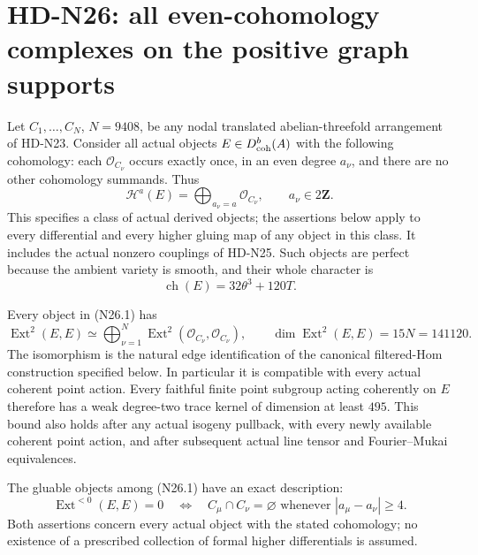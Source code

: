 \section{HD-N26: all even-cohomology complexes on the positive graph supports}
\label{sec:even-cohomology-graph-complexes}

Let $C_1,\ldots,C_N$, $N=9408$, be any nodal translated
abelian-threefold arrangement of HD-N23. Consider all actual
objects $E\in D^b_{\rm coh}(A)$ with the following cohomology:
each $\mathcal O_{C_\nu}$ occurs exactly once, in an even
degree $a_\nu$, and there are no other cohomology summands.
Thus
\[
 \mathcal H^a(E)=\bigoplus_{a_\nu=a}\mathcal O_{C_\nu},
 \qquad a_\nu\in2\mathbf Z.                              \tag{N26.1}
\]
This specifies a class of actual derived objects; the
assertions below apply to every differential and every
higher gluing map of any object in this class. It includes
the actual nonzero couplings of HD-N25. Such objects are
perfect because the ambient variety is smooth, and their
whole character is
\[
                   \operatorname{ch}(E)=32\theta^3+120T.
                                                               \tag{N26.2}
\]

Every object in (N26.1) has
\[
 \operatorname{Ext}^2(E,E)\simeq
   \bigoplus_{\nu=1}^N
       \operatorname{Ext}^2(\mathcal O_{C_\nu},\mathcal O_{C_\nu}),
 \qquad \dim\operatorname{Ext}^2(E,E)=15N=141120.          \tag{N26.3}
\]
The isomorphism is the natural edge identification of the
canonical filtered-Hom construction specified below. In
particular it is compatible with every actual coherent
point action. Every faithful finite point subgroup acting
coherently on $E$ therefore has a weak degree-two trace
kernel of dimension at least $495$. This bound also holds
after any actual isogeny pullback, with every newly available
coherent point action, and after subsequent actual line
tensor and Fourier--Mukai equivalences.

The gluable objects among (N26.1) have an exact description:
\[
 \operatorname{Ext}^{<0}(E,E)=0
 \quad\Longleftrightarrow\quad
 C_\mu\cap C_\nu=\varnothing
       \text{ whenever }|a_\mu-a_\nu|\ge4.               \tag{N26.4}
\]
Both assertions concern every actual object with the stated
cohomology; no existence of a prescribed collection of
formal higher differentials is assumed.

